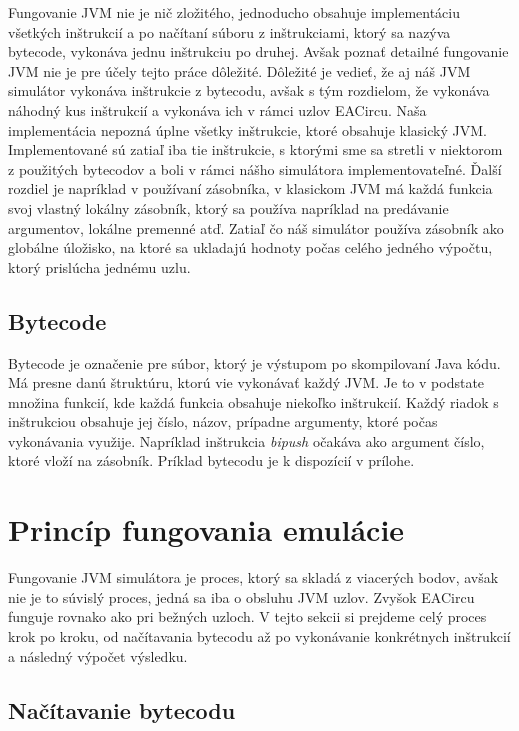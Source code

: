 Fungovanie JVM nie je nič zložitého, jednoducho obsahuje implementáciu všetkých inštrukcií a po načítaní súboru z inštrukciami, ktorý sa nazýva bytecode, vykonáva jednu inštrukciu po druhej. Avšak poznať detailné fungovanie JVM nie je pre účely tejto práce dôležité. Dôležité je vedieť, že aj náš JVM simulátor vykonáva inštrukcie z bytecodu, avšak s tým rozdielom, že vykonáva náhodný kus inštrukcií a vykonáva ich v rámci uzlov EACircu. Naša implementácia nepozná úplne všetky inštrukcie, ktoré obsahuje klasický JVM. Implementované sú zatiaľ iba tie inštrukcie, s ktorými sme sa stretli v niektorom z použitých bytecodov a boli v rámci nášho simulátora implementovateľné. Ďalší rozdiel je napríklad v používaní zásobníka, v klasickom JVM má každá funkcia svoj vlastný lokálny zásobník, ktorý sa používa napríklad na predávanie argumentov, lokálne premenné atď. Zatiaľ čo náš simulátor používa zásobník ako globálne úložisko, na ktoré sa ukladajú hodnoty počas celého jedného výpočtu, ktorý prislúcha jednému uzlu.  

\subsection{Bytecode}
\label{subsec:bytecode}

Bytecode je označenie pre súbor, ktorý je výstupom po skompilovaní Java kódu. Má presne danú štruktúru, ktorú vie vykonávať každý JVM. Je to v podstate množina funkcií, kde každá funkcia obsahuje niekoľko inštrukcií. Každý riadok s inštrukciou obsahuje jej číslo, názov, prípadne argumenty, ktoré počas vykonávania využije. Napríklad inštrukcia \textit{bipush} očakáva ako argument číslo, ktoré vloží na zásobník. Príklad bytecodu je k dispozícií v prílohe.

\section{Princíp fungovania emulácie}
\label{sec:jvm-principle}

Fungovanie JVM simulátora je proces, ktorý sa skladá z viacerých bodov, avšak nie je to súvislý proces, jedná sa iba o obsluhu JVM uzlov. Zvyšok EACircu funguje rovnako ako pri bežných uzloch. V tejto sekcii si prejdeme celý proces krok po kroku, od načítavania bytecodu až po vykonávanie konkrétnych inštrukcií a následný výpočet výsledku. 

\subsection{Načítavanie bytecodu}
\label{parsing-bytecode}

